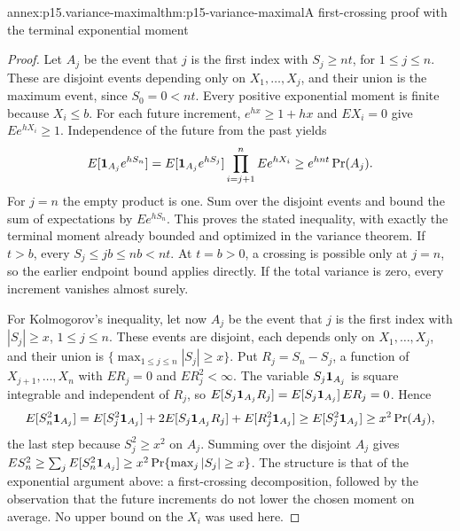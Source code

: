 \begin{annexitem}{annex:p15.variance-maximal}{thm:p15-variance-maximal}{A first-crossing proof with the terminal exponential moment}
\begin{proof}
Let \(A_j\) be the event that \(j\) is the first index with
\(S_j\geq nt\), for \(1\leq j\leq n\). These are disjoint events
depending only on \(X_1,\ldots,X_j\), and their union is the maximum
event, since \(S_0=0<nt\).
Every positive exponential moment is finite because \(X_i\leq b\).
For each future increment, \(e^{hx}\geq1+hx\) and \(EX_i=0\)
give \(Ee^{hX_i}\geq1\). Independence of the future from the past yields
\[
 E[{\bf1}_{A_j}e^{hS_n}]
 =E[{\bf1}_{A_j}e^{hS_j}]\prod_{i=j+1}^nEe^{hX_i}
 \geq e^{hnt}\Pr(A_j).
\]
For \(j=n\) the empty product is one.
Sum over the disjoint events and bound the sum of expectations by
\(Ee^{hS_n}\). This proves the stated inequality, with exactly the
terminal moment already bounded and optimized in the variance theorem.
If \(t>b\), every \(S_j\leq jb\leq nb<nt\).
At \(t=b>0\), a crossing is possible only at \(j=n\), so the earlier
endpoint bound applies directly. If the total variance is zero, every
increment vanishes almost surely.

For Kolmogorov's inequality, let now \(A_j\) be the event that \(j\) is
the first index with \(|S_j|\geq x\), \(1\leq j\leq n\). These events are
disjoint, each depends only on \(X_1,\ldots,X_j\), and their union is
\(\{\max_{1\leq j\leq n}|S_j|\geq x\}\). Put \(R_j=S_n-S_j\), a function
of \(X_{j+1},\ldots,X_n\) with \(ER_j=0\) and \(ER_j^2<\infty\). The
variable \(S_j{\bf1}_{A_j}\) is square integrable and independent of
\(R_j\), so \(E[S_j{\bf1}_{A_j}R_j]=E[S_j{\bf1}_{A_j}]\,ER_j=0\). Hence
\[
 E[S_n^2{\bf1}_{A_j}]
 =E[S_j^2{\bf1}_{A_j}]+2E[S_j{\bf1}_{A_j}R_j]+E[R_j^2{\bf1}_{A_j}]
 \geq E[S_j^2{\bf1}_{A_j}]\geq x^2\Pr(A_j),
\]
the last step because \(S_j^2\geq x^2\) on \(A_j\). Summing over the
disjoint \(A_j\) gives
\(ES_n^2\geq\sum_jE[S_n^2{\bf1}_{A_j}]\geq x^2\Pr\{\max_j|S_j|\geq x\}\).
The structure is that of the exponential argument above: a first-crossing
decomposition, followed by the observation that the future increments do
not lower the chosen moment on average. No upper bound on the \(X_i\) was
used here.
\end{proof}
\end{annexitem}

